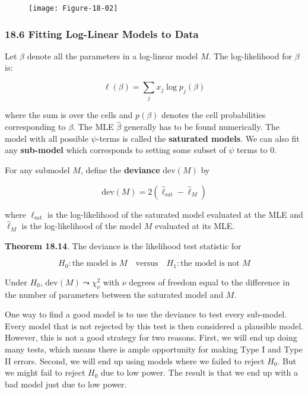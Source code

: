 \begin{figure}[H]
\texttt{[image: Figure-18-02]}
\end{figure}

\subsubsection{18.6 Fitting Log-Linear Models to Data}\label{fitting-log-linear-models-to-data}

Let \(\beta\) denote all the parameters in a log-linear model \(M\). The
log-likelihood for \(\beta\) is:

\[ \ell(\beta) = \sum_j x_j \log p_j(\beta) \]

where the sum is over the cells and \(p(\beta)\) denotes the cell
probabilities corresponding to \(\beta\). The MLE \(\hat{\beta}\)
generally has to be found numerically. The model with all possible
\(\psi\)-terms is called the \textbf{saturated models}. We can also fit
any \textbf{sub-model} which corresponds to setting some subset of
\(\psi\) terms to 0.

For any submodel \(M\), define the \textbf{deviance} \(\text{dev}(M)\)
by

\[ \text{dev}(M) = 2 (\hat{\ell}_\text{sat} - \hat{\ell}_M) \]

where \(\ell_\text{sat}\) is the log-likelihood of the saturated model
evaluated at the MLE and \(\hat{\ell}_M\) is the log-likelihood of the
model \(M\) evaluated at its MLE.

\textbf{Theorem 18.14}. The deviance is the likelihood test statistic
for

\[
H_0 : \text{the model is } M
\quad \text{versus} \quad
H_1 : \text{the model is not } M
\]

Under \(H_0\), \(\text{dev}(M) \leadsto \chi^2_\nu\) with \(\nu\)
degrees of freedom equal to the difference in the number of parameters
between the saturated model and \(M\).

One way to find a good model is to use the deviance to test every
sub-model. Every model that is not rejected by this test is then
considered a plausible model. However, this is not a good strategy for
two reasons. First, we will end up doing many tests, which means there
is ample opportunity for making Type I and Type II errors. Second, we
will end up using models where we failed to reject \(H_0\). But we might
fail to reject \(H_0\) due to low power. The result is that we end up
with a bad model just due to low power.

